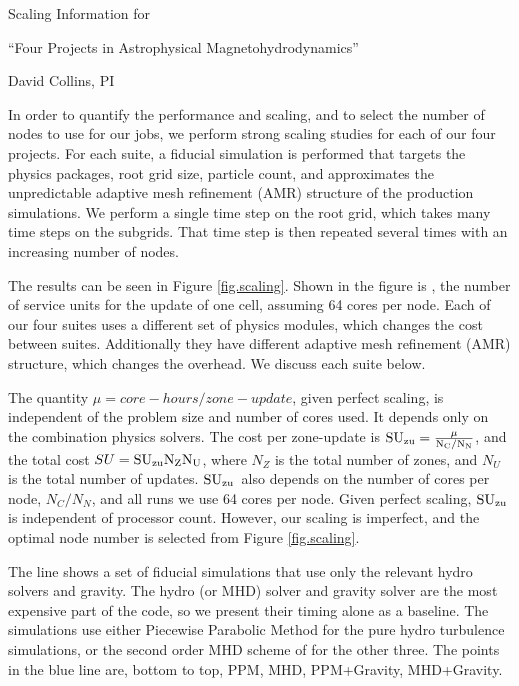 \documentclass[11pt]{NSF}  %
\begin{document}
\begin{centering}
\begin{LARGE}
Scaling Information for 

``Four Projects in Astrophysical Magnetohydrodynamics''
\end{LARGE}

David Collins, PI

\end{centering}


\pagestyle{plain}


In order to quantify the performance and scaling, and to select the number of
nodes to use for our jobs, we perform strong scaling studies for each of our four
projects.  For each suite, a fiducial simulation is performed
that targets the physics packages, root grid size, particle
count, and approximates the unpredictable adaptive mesh refinement (AMR)
structure of the production simulations.  
We perform a single time step on
the root grid, which takes many time steps on the subgrids. 
That time step is then repeated several times with an increasing number of
nodes.

The results can be seen in Figure \ref{fig.scaling}. Shown in the figure is \suzu, the number of
service units for the update of one cell, assuming 64 cores per node.  Each of
our four suites uses a different set of physics modules, which changes the cost
between suites.  Additionally they have different adaptive mesh refinement (AMR)
structure, which changes the overhead.  We discuss each suite below.

The quantity $\mu= core-hours/zone-update$, given perfect scaling, is
independent of the problem size and number of cores used.  It depends only on the
combination physics solvers.  The cost per zone-update is
$\rm{SU}_{\rm{zu}}=\frac{\mu}{N_C/N_N}$, and the total cost $SU=\rm{SU}_{\rm{zu}} N_Z N_U$, where $N_Z$ is the total number of
zones, and $N_U$ is the total number of updates.  $\rm{SU}_{\rm{zu}}$\ also depends on the
number of cores per node, $N_C/N_N$, and all runs we use 64 cores per node.
Given perfect scaling, $\rm{SU}_{\rm{zu}}$ is independent of
processor count.  However, our scaling is imperfect, and the optimal node number is
selected from  Figure \ref{fig.scaling}.

The  line shows a set of 
fiducial simulations that use only the
relevant hydro solvers and gravity.  The hydro (or MHD) solver and gravity
solver are the most expensive part of the code, so we present their timing alone
as a baseline.
The simulations use either Piecewise
Parabolic Method \citep{Colella84} for the pure hydro turbulence simulations,
or the second order MHD scheme of \citep{Li08a} for the other three.  The points
in the blue line are, bottom to top, PPM, MHD, PPM+Gravity, MHD+Gravity.  
\end{document}
